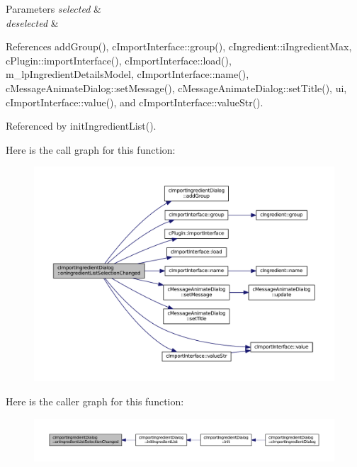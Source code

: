 \begin{DoxyParams}{Parameters}
{\em selected} & \\
\hline
{\em deselected} & \\
\hline
\end{DoxyParams}


References add\+Group(), c\+Import\+Interface\+::group(), c\+Ingredient\+::i\+Ingredient\+Max, c\+Plugin\+::import\+Interface(), c\+Import\+Interface\+::load(), m\+\_\+lp\+Ingredient\+Details\+Model, c\+Import\+Interface\+::name(), c\+Message\+Animate\+Dialog\+::set\+Message(), c\+Message\+Animate\+Dialog\+::set\+Title(), ui, c\+Import\+Interface\+::value(), and c\+Import\+Interface\+::value\+Str().



Referenced by init\+Ingredient\+List().



Here is the call graph for this function\+:
\nopagebreak
\begin{figure}[H]
\begin{center}
\leavevmode
\includegraphics[width=350pt]{classc_import_ingredient_dialog_a7aaca4be76facdc5c90fd321825a6289_cgraph}
\end{center}
\end{figure}




Here is the caller graph for this function\+:
\nopagebreak
\begin{figure}[H]
\begin{center}
\leavevmode
\includegraphics[width=350pt]{classc_import_ingredient_dialog_a7aaca4be76facdc5c90fd321825a6289_icgraph}
\end{center}
\end{figure}


